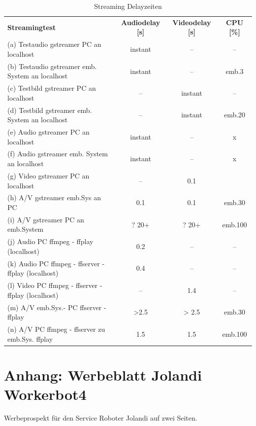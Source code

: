 \begin{table}[H]
\centering
 \begin{tabular}{l|c|c|c}
 \textbf{Streamingtest}&\textbf{Audiodelay [s]}&\textbf{Videodelay [s]} & \textbf{CPU [\%]}\\
\cline{1-4} 
 (a) Testaudio gstreamer PC an localhost          & instant   & --    & --\\
 (b) Testaudio gstreamer emb. System an localhost & instant   & --    & emb.3\\
 (c) Testbild gstreamer PC an localhost           & --        & instant & -- \\
 (d) Testbild gstreamer emb. System an localhost  & --        & instant & emb.20 \\                        
 (e) Audio gstreamer PC an localhost              & instant   & --    & x\\
 (f) Audio gstreamer emb. System an localhost     & instant   & --    & x\\
 (g) Video gstreamer PC an localhost              & --        & 0.1   &  \\
 (h) A/V gstreamer emb.Sys an PC                  & 0.1       & 0.1   & emb.30 \\
 (i) A/V gstreamer PC an emb.System               & ? 20+     & ? 20+ & emb.100\\ 
 \cline{1-4}
 (j) Audio PC ffmpeg - ffplay (localhost)            & 0.2   & --   & --  \\
 (k) Audio PC ffmpeg - ffserver - ffplay (localhost) & 0.4   & --   & --  \\
 (l) Video PC ffmpeg - ffserver - ffplay (localhost) & --    & 1.4  & -- \\
 (m) A/V emb.Sys.- PC ffserver - ffplay              & >2.5  & > 2.5 & emb.30 \\
 (n) A/V PC ffmpeg - ffserver zu emb.Sys. ffplay     & 1.5    & 1.5  & emb.100 \\
\end{tabular}

     \caption{Streaming Delayzeiten}
     \label{tbl:beispieltabelle}
   \end{table}

\newpage
\section{Anhang: Werbeblatt Jolandi Workerbot4} \label{RefAnhang}
Werbeprospekt für den Service Roboter Jolandi auf zwei Seiten.\\

